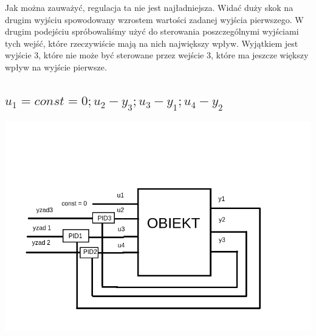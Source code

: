 %     


%     


Jak można zauważyć, regulacja ta nie jest najładniejsza. Widać duży skok na drugim wyjściu spowodowany wzrostem wartości zadanej wyjścia pierwszego. W drugim podejściu spróbowaliśmy użyć do sterowania poszczególnymi wyjściami tych wejść, które rzeczywiście mają na nich największy wpływ. Wyjątkiem jest wyjście 3, które nie może być sterowane przez wejście 3, które ma jeszcze większy wpływ na wyjście pierwsze.

\subsection{$u_1 = const = 0; u_2 - y_3; u_3 - y_1; u_4 - y_2$}

\includegraphics[scale=0.5]{../images/pid2.png}

